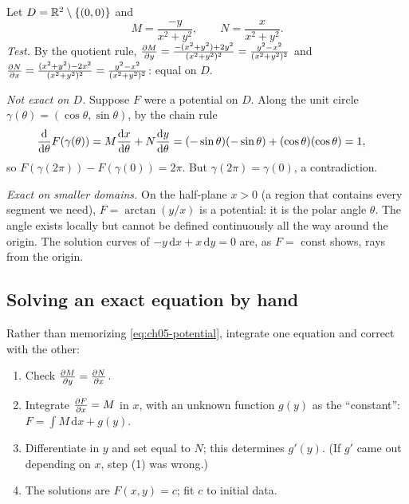 \begin{example}\label{ex:ch05-angle}
Let $D = \mathbb{R}^2\setminus\{(0,0)\}$ and
\[
  M = \frac{-y}{x^2+y^2},\qquad N = \frac{x}{x^2+y^2} .
\]
\emph{Test.} By the quotient rule,
$\frac{\partial M}{\partial y} = \frac{-(x^2+y^2) + 2y^2}{(x^2+y^2)^2} = \frac{y^2 - x^2}{(x^2+y^2)^2}$
and $\frac{\partial N}{\partial x} = \frac{(x^2+y^2) - 2x^2}{(x^2+y^2)^2} = \frac{y^2-x^2}{(x^2+y^2)^2}$:
equal on $D$.

\emph{Not exact on $D$.} Suppose $F$ were a potential on $D$. Along the unit
circle $\gamma(\theta) = (\cos\theta,\sin\theta)$, by the chain rule
\begin{align*}
  \frac{\mathrm{d}}{\mathrm{d}\theta}F(\gamma(\theta))
  &= M\frac{\mathrm{d}x}{\mathrm{d}\theta} + N\frac{\mathrm{d}y}{\mathrm{d}\theta}
   = (-\sin\theta)(-\sin\theta) + (\cos\theta)(\cos\theta) = 1,
\end{align*}
so $F(\gamma(2\pi)) - F(\gamma(0)) = 2\pi$. But $\gamma(2\pi) = \gamma(0)$, a
contradiction.

\emph{Exact on smaller domains.} On the half-plane $x>0$ (a region that
contains every segment we need), $F = \arctan(y/x)$ is a potential: it is the
polar angle $\theta$. The angle exists locally but cannot be defined
continuously all the way around the origin. The solution curves of
$-y\,\mathrm{d}x + x\,\mathrm{d}y = 0$ are, as $F = $ const shows, rays from
the origin.
\end{example}

\subsection{Solving an exact equation by hand}

Rather than memorizing \eqref{eq:ch05-potential}, integrate one equation and
correct with the other:
\begin{enumerate}[label=(\arabic*)]
  \item Check $\frac{\partial M}{\partial y} = \frac{\partial N}{\partial x}$.
  \item Integrate $\frac{\partial F}{\partial x} = M$ in $x$, with an unknown function $g(y)$ as
        the ``constant'': $F = \int M\,\mathrm{d}x + g(y)$.
  \item Differentiate in $y$ and set equal to $N$; this determines $g'(y)$.
        (If $g'$ came out depending on $x$, step (1) was wrong.)
  \item The solutions are $F(x,y) = c$; fit $c$ to initial data.
\end{enumerate}

